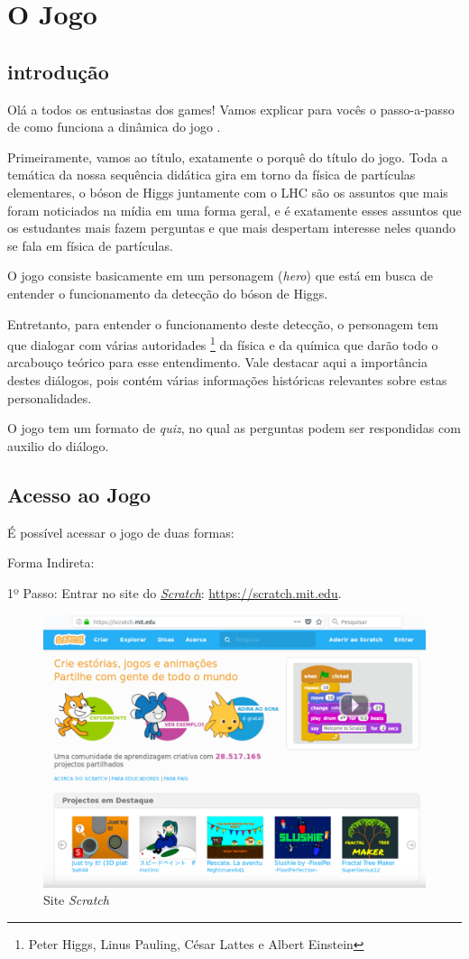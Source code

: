 \documentclass[12pt,fleqn]{book} %
\begin{document}

\chapter{O Jogo }
\section{introdução}
Olá a todos os entusiastas dos games! Vamos explicar para vocês o passo-a-passo de como funciona a dinâmica do jogo .

Primeiramente, vamos ao título, exatamente o porquê do título do jogo. Toda a temática da nossa sequência didática gira em torno da física de partículas elementares, o bóson de Higgs juntamente com o LHC são os assuntos que mais foram noticiados na mídia em uma forma geral, e é exatamente esses assuntos que os estudantes mais fazem perguntas e que mais despertam interesse neles quando se fala em física de partículas.

O jogo consiste basicamente em um personagem (\textit{hero}) que está em busca de entender o funcionamento da detecção do bóson de Higgs.

Entretanto, para entender o funcionamento deste detecção, o personagem tem que dialogar com várias autoridades \footnote{Peter Higgs, Linus Pauling, César Lattes e Albert Einstein} da física e da química que darão todo o arcabouço teórico para esse entendimento. Vale destacar aqui a importância destes diálogos, pois contém várias informações históricas relevantes sobre estas personalidades. 

O jogo tem um formato de \textit{quiz}, no qual as perguntas podem ser respondidas com auxilio do diálogo.

\section{Acesso ao Jogo}
É possível acessar o jogo de duas formas: 

Forma Indireta:

1º Passo: Entrar no site do \href{https://scratch.mit.edu}{\textit{Scratch}}: \url{https://scratch.mit.edu}.

\begin{figure}[ht]
	\centering
	\includegraphics[width=0.7 \textwidth]{Produto/site_scratch}
	\caption{Site \textit{Scratch}}
	\label{fig:app_a:sitescratch}
\end{figure}
\end{document}
